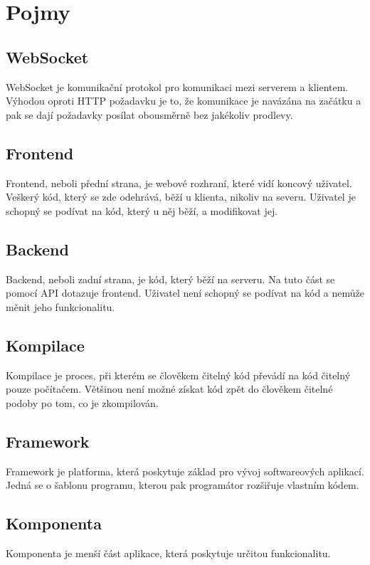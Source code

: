 \section{Pojmy}

\subsection{WebSocket}
WebSocket je komunikační protokol pro komunikaci mezi serverem a klientem. Výhodou oproti HTTP požadavku je to, že komunikace je navázána na začátku a pak se dají požadavky posílat obousměrně bez jakékoliv prodlevy.

\subsection{Frontend}
Frontend, neboli přední strana, je webové rozhraní, které vidí koncový uživatel. Veškerý kód, který se zde odehrává, běží u klienta, nikoliv na severu. Uživatel je schopný se podívat na kód, který u něj běží, a modifikovat jej.

\subsection{Backend}
Backend, neboli zadní strana, je kód, který běží na serveru. Na tuto část se pomocí API dotazuje frontend. Uživatel není schopný se podívat na kód a nemůže měnit jeho funkcionalitu.

\subsection{Kompilace}
Kompilace je proces, při kterém se člověkem čitelný kód převádí na kód čitelný pouze počítačem. Většinou není možné získat kód zpět do člověkem čitelné podoby po tom, co je zkompilován.

\subsection{Framework}
Framework je platforma, která poskytuje základ pro vývoj softwareových aplikací. \cite{Framework} Jedná se o šablonu programu, kterou pak programátor rozšiřuje vlastním kódem.

\subsection{Komponenta}
Komponenta je menší část aplikace, která poskytuje určitou funkcionalitu.

